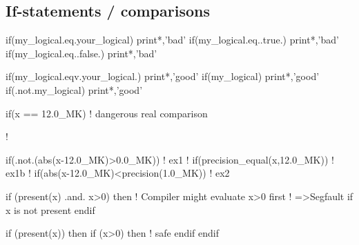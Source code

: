 \documentclass{article}
\begin{document}
\subsection{If-statements / comparisons}
\label{sec:if}
\begin{codea}
if(my_logical.eq.your_logical) print*,'bad'
if(my_logical.eq..true.) print*,'bad'
if(my_logical.eq..false.) print*,'bad'
\end{codea} 
\begin{codeb}
if(my_logical.eqv.your_logical.) print*,'good'
if(my_logical) print*,'good'
if(.not.my_logical) print*,'good'
\end{codeb}
\begin{codea}
if(x == 12.0_MK) ! dangerous real comparison



!
\end{codea} 
\begin{codeb}
if(.not.(abs(x-12.0_MK)>0.0_MK))     ! ex1
!
if(precision_equal(x,12.0_MK))       ! ex1b
!
if(abs(x-12.0_MK)<precision(1.0_MK)) ! ex2
\end{codeb}
\begin{codea}
if (present(x) .and. x>0) then 
   ! Compiler might evaluate x>0 first
   ! =>Segfault if x is not present
endif
\end{codea} 
\begin{codeb}
if (present(x)) then
  if (x>0) then ! safe
  endif
endif
\end{codeb}

\end{document}

